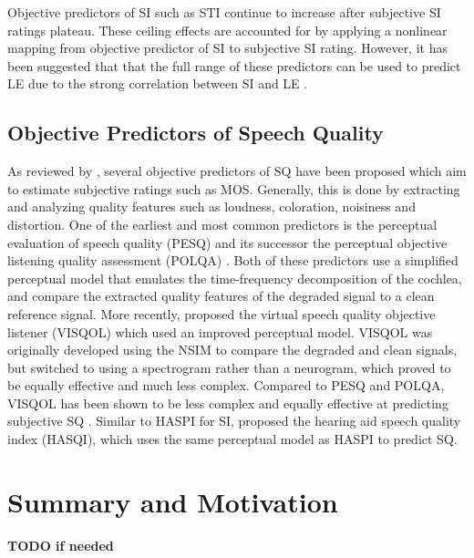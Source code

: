 Objective predictors of SI such as STI continue to increase after subjective SI ratings plateau. These ceiling effects are accounted for by applying a nonlinear mapping from objective predictor of SI to subjective SI rating. However, it has been suggested that that the full range of these predictors can be used to predict LE due to the strong correlation between SI and LE \citep{schepker2016perceived}.

\subsection{Objective Predictors of Speech Quality}

As reviewed by \cite{torcoli2021objective}, several objective predictors of SQ have been proposed which aim to estimate subjective ratings such as MOS. Generally, this is done by extracting and analyzing quality features such as loudness, coloration, noisiness and distortion. One of the earliest and most common predictors is the perceptual evaluation of speech quality (PESQ) \citep{itu2003pesq} and its successor the perceptual objective listening quality assessment (POLQA) \citep{itu2011polqa}. Both of these predictors use a simplified perceptual model that emulates the time-frequency decomposition of the cochlea, and compare the extracted quality features of the degraded signal to a clean reference signal. More recently, \cite{hines2015visqol} proposed the virtual speech quality objective listener (VISQOL) which used an improved perceptual model. VISQOL was originally developed using the NSIM to compare the degraded and clean signals, but switched to using a spectrogram rather than a neurogram, which proved to be equally effective and much less complex. Compared to PESQ and POLQA, VISQOL has been shown to be less complex and equally effective at predicting subjective SQ \citep{hines2013robustness}. Similar to HASPI for SI, \cite{kates2022overview} proposed the hearing aid speech quality index (HASQI), which uses the same perceptual model as HASPI to predict SQ.

\section{Summary and Motivation}

\textbf{TODO if needed}



